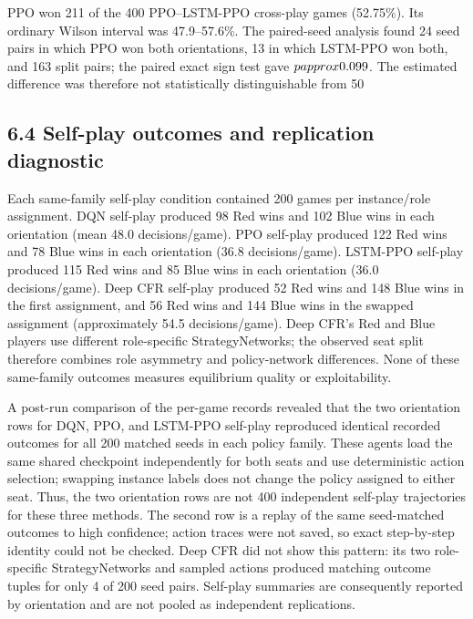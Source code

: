 \documentclass[11pt]{article}
\begin{document}
PPO won 211 of the 400 PPO--LSTM-PPO cross-play games (52.75\%). Its ordinary Wilson interval was 47.9--57.6\%. The paired-seed analysis found 24 seed pairs in which PPO won both orientations, 13 in which LSTM-PPO won both, and 163 split pairs; the paired exact sign test gave $p\\approx0.099$. The estimated difference was therefore not statistically distinguishable from 50\\%

\subsection*{6.4 Self-play outcomes and replication diagnostic}

Each same-family self-play condition contained 200 games per instance/role assignment. DQN self-play produced 98 Red wins and 102 Blue wins in each orientation (mean 48.0 decisions/game). PPO self-play produced 122 Red wins and 78 Blue wins in each orientation (36.8 decisions/game). LSTM-PPO self-play produced 115 Red wins and 85 Blue wins in each orientation (36.0 decisions/game). Deep CFR self-play produced 52 Red wins and 148 Blue wins in the first assignment, and 56 Red wins and 144 Blue wins in the swapped assignment (approximately 54.5 decisions/game). Deep CFR's Red and Blue players use different role-specific StrategyNetworks; the observed seat split therefore combines role asymmetry and policy-network differences. None of these same-family outcomes measures equilibrium quality or exploitability.

A post-run comparison of the per-game records revealed that the two orientation rows for DQN, PPO, and LSTM-PPO self-play reproduced identical recorded outcomes for all 200 matched seeds in each policy family. These agents load the same shared checkpoint independently for both seats and use deterministic action selection; swapping instance labels does not change the policy assigned to either seat. Thus, the two orientation rows are not 400 independent self-play trajectories for these three methods. The second row is a replay of the same seed-matched outcomes to high confidence; action traces were not saved, so exact step-by-step identity could not be checked. Deep CFR did not show this pattern: its two role-specific StrategyNetworks and sampled actions produced matching outcome tuples for only 4 of 200 seed pairs. Self-play summaries are consequently reported by orientation and are not pooled as independent replications.
\end{document}

